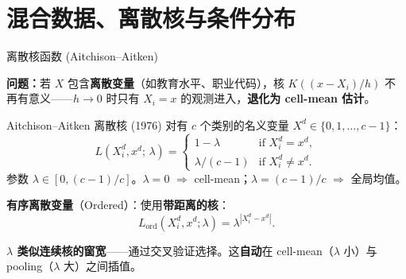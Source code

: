\documentclass[aspectratio=169, 10pt]{beamer}
\begin{document}

\section{混合数据、离散核与条件分布}

\begin{frame}{离散核函数 (Aitchison--Aitken)}

  \textbf{问题：}若 $X$ 包含\textbf{离散变量}（如教育水平、职业代码），核 $K((x-X_i)/h)$ 不再有意义——$h\to 0$ 时只有 $X_i=x$ 的观测进入，\textbf{退化为 cell-mean 估计}。

  \begin{definitionbox}{Aitchison--Aitken 离散核 (1976)}
    对有 $c$ 个类别的名义变量 $X^d\in\{0,1,\ldots,c-1\}$：
    \[
      L(X_i^d, x^d;\, \lambda) = \begin{cases}
        1 - \lambda & \text{if } X_i^d = x^d,\\
        \lambda/(c-1) & \text{if } X_i^d \neq x^d.
      \end{cases}
    \]
    参数 $\lambda\in [0, (c-1)/c]$。$\lambda = 0$ $\Rightarrow$ cell-mean；$\lambda = (c-1)/c$ $\Rightarrow$ 全局均值。
  \end{definitionbox}

  \vspace{0.3em}

  \textbf{有序离散变量}（Ordered）：使用\textbf{带距离的核}：
  \[
    L_{\text{ord}}(X_i^d, x^d; \lambda) = \lambda^{|X_i^d - x^d|}.
  \]

  \begin{keybox}
    \textbf{$\lambda$ 类似连续核的窗宽}——通过交叉验证选择。这\textbf{自动}在 cell-mean（$\lambda$ 小）与 pooling（$\lambda$ 大）之间插值。
  \end{keybox}

\end{frame}
\end{document}
